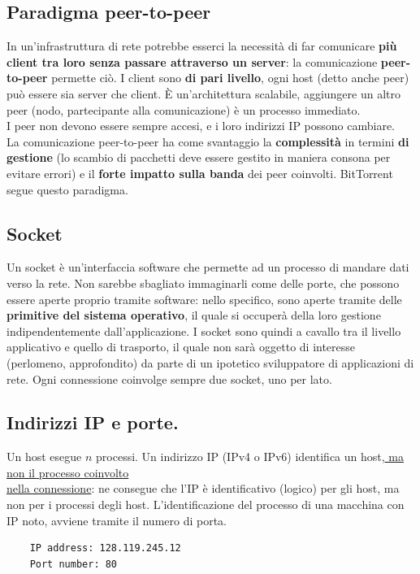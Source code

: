 \subsection{Paradigma peer-to-peer}
In un'infrastruttura di rete potrebbe esserci la necessità di far comunicare \textbf{più client tra loro senza passare attraverso un server}: la comunicazione \textbf{peer-to-peer} permette ciò. I client sono \textbf{di pari livello}, ogni host (detto anche peer) può essere sia server che client.
È un'architettura scalabile, aggiungere un altro peer (nodo, partecipante alla comunicazione) è un processo immediato.\\
I peer non devono essere sempre accesi, e i loro indirizzi IP possono cambiare.\\
La comunicazione peer-to-peer ha come svantaggio la \textbf{complessità} in termini \textbf{di gestione} (lo scambio di pacchetti deve essere gestito in maniera consona per evitare errori) e il \textbf{forte impatto sulla banda} dei peer coinvolti. BitTorrent segue questo paradigma.

\subsection{Socket}
Un socket è un'interfaccia software che permette ad un processo di mandare dati verso la rete. Non sarebbe sbagliato immaginarli come delle porte, che possono essere aperte proprio tramite software: nello specifico, sono aperte tramite delle \textbf{primitive del sistema operativo}, il quale si occuperà della loro gestione indipendentemente dall'applicazione. I socket sono quindi a cavallo tra il livello applicativo e quello di trasporto, il quale non sarà oggetto di interesse (perlomeno, approfondito) da parte di un ipotetico sviluppatore di applicazioni di rete. Ogni connessione coinvolge sempre due socket, uno per lato.

\newpage

\subsection{Indirizzi IP e porte.}
Un host esegue $n$ processi. Un indirizzo IP (IPv4 o IPv6) identifica un host,\underline{ ma non il processo coinvolto}\\ \underline{nella connessione}: ne consegue che l'IP è identificativo (logico) per gli host, ma non per i processi degli host.
L'identificazione del processo di una macchina con IP noto, avviene tramite il numero di porta. 
\begin{verbatim}
    IP address: 128.119.245.12
    Port number: 80
\end{verbatim}

